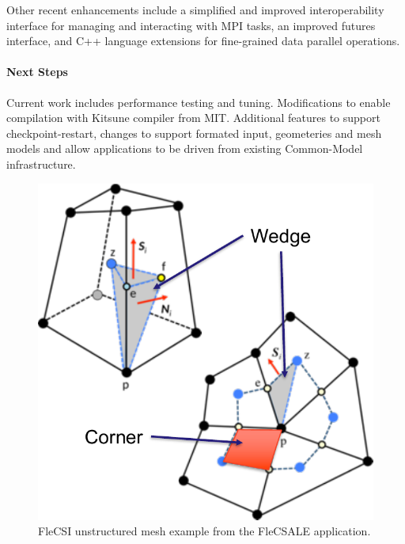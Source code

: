 Other recent enhancements include a simplified and improved
interoperability interface for managing and interacting with MPI tasks,
an improved futures interface, and C++ language extensions for
fine-grained data parallel operations.

\paragraph{Next Steps}

Current work includes performance testing and tuning. Modifications 
to enable compilation with Kitsune compiler from MIT. Additional 
features to support checkpoint-restart, changes to support formated 
input, geometeries and mesh models and allow applications to be driven 
from existing Common-Model infrastructure.

\begin{figure}
  \centering
  \includegraphics[scale=0.6]{projects/2.3.3-MathLibs/2.3.3.02-LANL-ATDM-MathLibs/mesh.pdf}
  \caption{FleCSI unstructured mesh example from the FleCSALE application.}
  \label{fig:mesh}
\end{figure}
